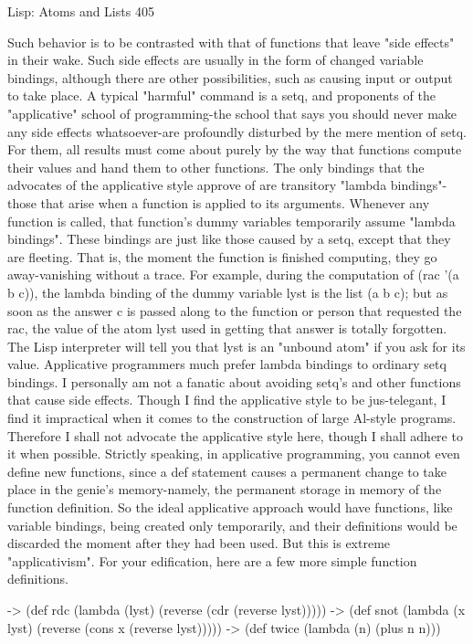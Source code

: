 Lisp: Atoms and Lists                                                                405

         Such behavior is to be contrasted with that of functions that leave "side
effects" in their wake. Such side effects are usually in the form of changed variable
bindings, although there are other possibilities, such as causing input or output to take
place. A typical "harmful" command is a setq, and proponents of the "applicative"
school of programming-the school that says you should never make any side effects
whatsoever-are profoundly disturbed by the mere mention of setq. For them, all
results must come about purely by the way that functions compute their values and
hand them to other functions.
         The only bindings that the advocates of the applicative style approve of are
transitory "lambda bindings"-those that arise when a function is applied to its
arguments. Whenever any function is called, that function's dummy variables
temporarily assume "lambda bindings". These bindings are just like those caused by a
setq, except that they are fleeting. That is, the moment the function is finished
computing, they go away-vanishing without a trace. For example, during the
computation of (rac '(a b c)), the lambda binding of the dummy variable lyst is the
list (a b c); but as soon as the answer c is passed along to the function or person that
requested the rac, the value of the atom lyst used in getting that answer is totally
forgotten. The Lisp interpreter will tell you that lyst is an "unbound atom" if you ask
for its value. Applicative programmers much prefer lambda bindings to ordinary setq
bindings.
I personally am not a fanatic about avoiding setq's and other functions that cause side
effects. Though I find the applicative style to be jus-telegant, I find it impractical
when it comes to the construction of large Al-style programs. Therefore I shall not
advocate the applicative style here, though I shall adhere to it when possible. Strictly
speaking, in applicative programming, you cannot even define new functions, since a
def statement causes a permanent change to take place in the genie's memory-namely,
the permanent storage in memory of the function definition. So the ideal applicative
approach would have functions, like variable bindings, being created only
temporarily, and their definitions would be discarded the moment after they had been
used. But this is extreme "applicativism".
         For your edification, here are a few more simple function definitions.

-> (def rdc (lambda (lyst) (reverse (cdr (reverse lyst)))))
-> (def snot (lambda (x lyst) (reverse (cons x (reverse lyst)))))
-> (def twice (lambda (n) (plus n n)))

